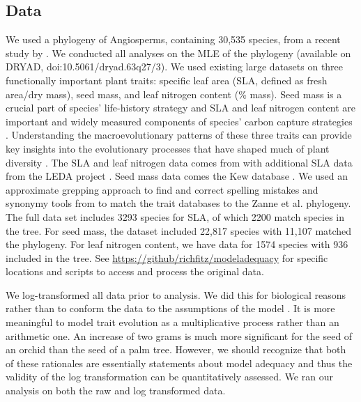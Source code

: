 \subsection{Data}
We used a phylogeny of Angiosperms, containing 30,535 species, from a recent study by \citet{Zanne2013}.  We conducted all analyses on the MLE of the phylogeny (available on DRYAD, doi:10.5061/dryad.63q27/3). We used existing large datasets on three functionally important plant traits: specific leaf area (SLA, defined as fresh area/dry mass), seed mass, and leaf nitrogen content (\% mass). Seed mass is a crucial part of species' life-history strategy \citep{Leishman2000, Westoby2002} and SLA and leaf nitrogen content are important and widely measured components of species' carbon capture strategies \citep{Wright2004}. Understanding the macroevolutionary patterns of these three traits can provide key insights into the evolutionary processes that have shaped much of plant diversity \citep{ksi}. The SLA and leaf nitrogen data comes from \citet{Wright2004} with additional SLA data from the LEDA project \citep{Kleyer2008}. Seed mass data comes the Kew database \citep{Kew2008}. We used an approximate grepping approach to find and correct spelling mistakes and synonymy tools from \citet{ThePlantList} to match the trait databases to the Zanne et al. phylogeny. 
The full data set includes 3293 species for SLA, of which 2200 match species in the \citet{Zanne2013} tree. For seed mass, the dataset included 22,817 species with 11,107 matched the phylogeny. For leaf nitrogen content, we have data for 1574 species with 936 included in the tree. 
%
See \url{https://github/richfitz/modeladequacy} for specific locations and scripts to access and process the original data. 

We log-transformed all data prior to analysis. We did this for biological reasons rather than to conform the data to the assumptions of the model \citep{Houle2011}. It is more meaningful to model trait evolution as a multiplicative process rather than an arithmetic one. An increase of two grams is much more significant for the seed of an orchid than the seed of a palm tree. However, we should recognize that both of these rationales are essentially statements about model adequacy and thus the validity of the log transformation can be quantitatively assessed. We ran our analysis on both the raw and log transformed data.


